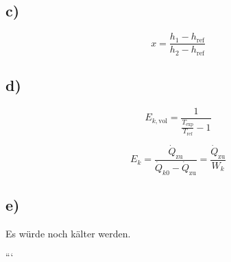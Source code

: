\subsection*{c)}
\[
x = \frac{h_1 - h_{\text{ref}}}{h_2 - h_{\text{ref}}}
\]

\subsection*{d)}
\[
E_{k, \text{vol}} = \frac{1}{\frac{T_{\text{exp}}}{T_{\text{ref}}} - 1}
\]

\[
E_{k} = \frac{\dot{Q}_{\text{zu}}}{\dot{Q}_{k0} - \dot{Q}_{\text{zu}}} = \frac{\dot{Q}_{\text{zu}}}{W_{k}}
\]

\subsection*{e)}
Es würde noch kälter werden.

```